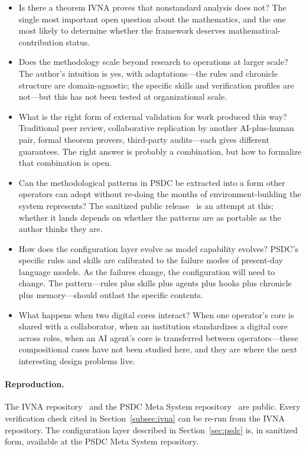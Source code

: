\documentclass[12pt]{article}
\begin{document}
\begin{itemize}[leftmargin=*]
\item Is there a theorem IVNA proves that nonstandard analysis does not? The single most important open question about the mathematics, and the one most likely to determine whether the framework deserves mathematical-contribution status.
\item Does the methodology scale beyond research to operations at larger scale? The author's intuition is yes, with adaptations---the rules and chronicle structure are domain-agnostic; the specific skills and verification profiles are not---but this has not been tested at organizational scale.
\item What is the right form of external validation for work produced this way? Traditional peer review, collaborative replication by another AI-plus-human pair, formal theorem provers, third-party audits---each gives different guarantees. The right answer is probably a combination, but how to formalize that combination is open.
\item Can the methodological patterns in PSDC be extracted into a form other operators can adopt without re-doing the months of environment-building the system represents? The sanitized public release~\cite{psdcrepo} is an attempt at this; whether it lands depends on whether the patterns are as portable as the author thinks they are.
\item How does the configuration layer evolve as model capability evolves? PSDC's specific rules and skills are calibrated to the failure modes of present-day language models. As the failures change, the configuration will need to change. The pattern---rules plus skills plus agents plus hooks plus chronicle plus memory---should outlast the specific contents.
\item What happens when two digital cores interact? When one operator's core is shared with a collaborator, when an institution standardizes a digital core across roles, when an AI agent's core is transferred between operators---these compositional cases have not been studied here, and they are where the next interesting design problems live.
\end{itemize}

\paragraph{Reproduction.} The IVNA repository~\cite{ivnarepo} and the PSDC Meta System repository~\cite{psdcrepo} are public. Every verification check cited in Section~\ref{subsec:ivna} can be re-run from the IVNA repository. The configuration layer described in Section~\ref{sec:psdc} is, in sanitized form, available at the PSDC Meta System repository.
\end{document}
